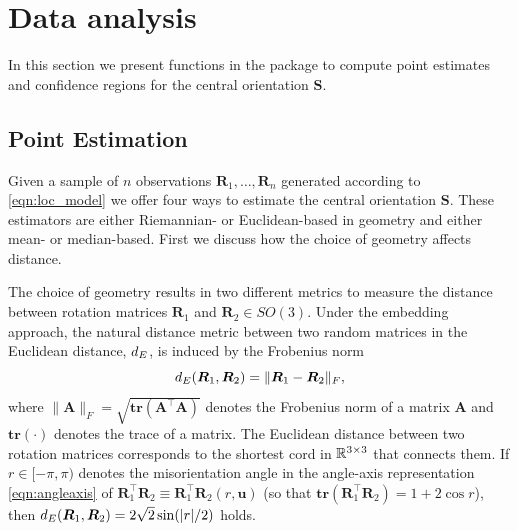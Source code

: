 %
%
%

\section{Data analysis\label{section:analysis}}

In this section we present functions in the  package to compute point estimates and confidence regions for the central orientation $\bm S$.

\subsection{Point Estimation}
Given a sample of $n$ observations $\bm R_1,\dots,\bm R_{n}$ generated according to \eqref{eqn:loc_model} we offer four ways to estimate the central orientation $\bm S$.  These estimators are either Riemannian- or Euclidean-based in geometry and either mean- or median-based.  First we discuss how the choice of geometry affects distance.

The choice of geometry results in two different metrics to measure the distance between rotation matrices $\bm{R}_1$ and $\bm{R}_2 \in SO(3)$. Under the embedding approach, the natural distance metric between two random matrices in the Euclidean distance, $d_E$, is induced by the Frobenius norm 
\begin{equation}
\label{d_E}
d_E(\bm{R}_1,\bm{R}_2)=\|\bm{R}_1-\bm{R}_2\|_F, 
\end{equation}
where $\|\bm{A}\|_F = \sqrt{\mathbf{tr}({\bm A^\top \bm A})}$ denotes the Frobenius norm of a matrix $\bm A$ and $\mathbf{tr}(\cdot)$ denotes the trace of a matrix.  The Euclidean distance between two rotation matrices corresponds to the shortest cord in $\mathbb{R}^{3\times3}$ that connects them.  If $r\in[-\pi,\pi)$ denotes the misorientation angle in the angle-axis representation \eqref{eqn:angleaxis} of $\bm{R}_1^\top \bm{R}_2 \equiv \bm{R}_1^\top \bm{R}_2(r,\bm{u})$ (so that $\mathbf{tr}(\bm{R}_1^\top \bm{R}_2) =1 +2 \cos r$), then $d_E(\bm{R}_1,\bm{R}_2) = 2\sqrt{2}\sin(|r|/2)$ holds.

